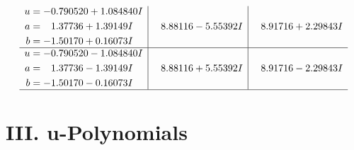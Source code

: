 \documentclass[1p]{elsarticle_modified}
\theoremstyle{definition}
\begin{document}
$$\begin{array}{c|c|c}
\begin{aligned}
u &= -0.790520 + 1.084840 I \\
a &= \phantom{-}1.37736 + 1.39149 I \\
b &= -1.50170 + 0.16073 I\end{aligned}
 & \phantom{-}8.88116 - 5.55392 I & \phantom{-}8.91716 + 2.29843 I \\ \hline\begin{aligned}
u &= -0.790520 - 1.084840 I \\
a &= \phantom{-}1.37736 - 1.39149 I \\
b &= -1.50170 - 0.16073 I\end{aligned}
 & \phantom{-}8.88116 + 5.55392 I & \phantom{-}8.91716 - 2.29843 I\\
 \hline 
 \end{array}$$\newpage
\newpage\renewcommand{\arraystretch}{1}
\centering \section*{ III. u-Polynomials}
\end{document}
